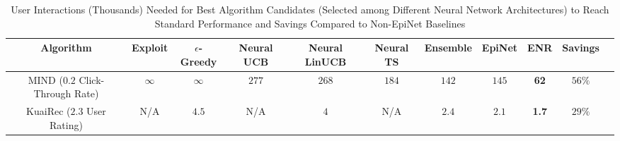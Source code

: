 \begin{table}[t!]
\small
  \caption{User Interactions (Thousands) Needed for Best Algorithm Candidates (Selected among Different Neural Network Architectures) to Reach Standard Performance and Savings Compared to Non-EpiNet Baselines}
  \vspace{-0.1in}
  \label{tab:sample_complexity}
  \begin{tabular}{c|cccccc|cc|cc}
    \toprule
    Algorithm & Exploit & $\epsilon$-Greedy & Neural UCB & Neural LinUCB & Neural TS & Ensemble & EpiNet & ENR & Savings\\
    \midrule 
    MIND ($0.2$ Click-Through Rate) & $\infty$ & $\infty$ & $277$ & $268$ & $184$ & $142$ & $145$ & \textbf{62} & $56\%$\\
    KuaiRec ($2.3$ User Rating) & N/A & $4.5$ & N/A & $4$ & N/A & $2.4$ & $2.1$ & \textbf{1.7} & $29\%$\\
  \bottomrule
\end{tabular}
\vspace{-0.1in}
\end{table}


